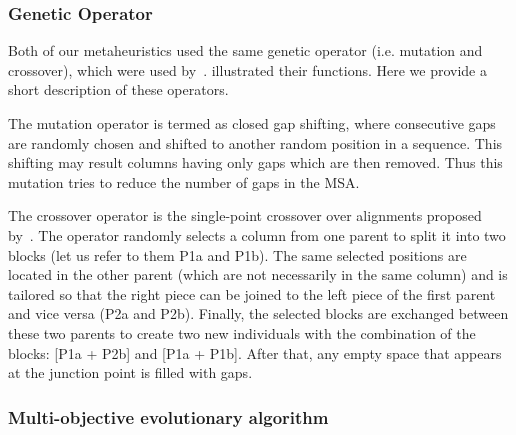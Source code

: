 \subsubsection{Genetic Operator}
Both of our metaheuristics used the same genetic operator (i.e. mutation and crossover), which were used by~\citealp{ortuno2013optimizing}. \citealp{zambrano2017multi} illustrated their functions. Here we provide a short description of these operators. 

The mutation operator is termed as closed gap shifting, where consecutive gaps are randomly chosen and shifted to another random position in a sequence. This shifting may result columns having only gaps which are then removed. Thus this mutation tries to reduce the number of gaps in the MSA.

The crossover operator is the single-point crossover over alignments proposed by~\citealp{da2010alineaga}. The operator randomly selects a column from one parent to split it into two blocks (let us refer to them P1a and P1b). The same selected positions are located in the other parent (which are not necessarily in the same column) and is tailored so that the right piece can be joined to the left piece of the first parent and vice versa (P2a and P2b). Finally, the selected blocks are exchanged between these two parents to create two new individuals with the combination of the blocks: [P1a + P2b] and [P1a + P1b]. After that, any empty space that appears at the junction point is filled with gaps.
\subsubsection{Multi-objective evolutionary algorithm}
